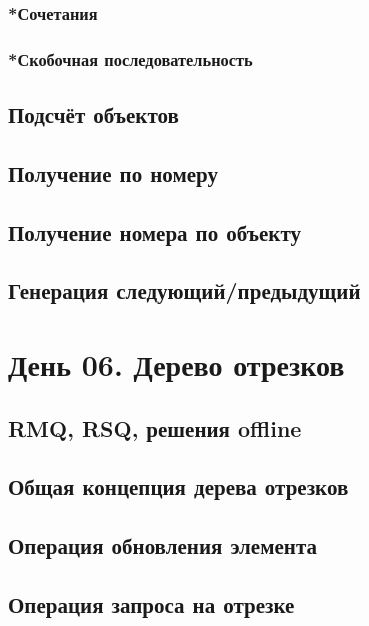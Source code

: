 \documentclass[a4paper,12pt]{article}
\begin{document}
      \subsubsection{*Сочетания}
      \subsubsection{*Скобочная последовательность}

    \subsection{Подсчёт объектов}

    \subsection{Получение по номеру}

    \subsection{Получение номера по объекту}

    \subsection{Генерация следующий/предыдущий}

  \newpage

  \section{День 06. Дерево отрезков}

    \subsection{RMQ, RSQ, решения offline}

    \subsection{Общая концепция дерева отрезков}

    \subsection{Операция обновления элемента}

    \subsection{Операция запроса на отрезке}
\end{document}
